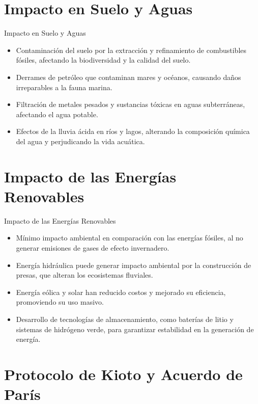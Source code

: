 \documentclass[main.tex]{subfiles}
\begin{document}
\section{Impacto en Suelo y Aguas}

\begin{frame}{Impacto en Suelo y Aguas}
    \begin{itemize}
        \item Contaminación del suelo por la extracción y refinamiento de combustibles fósiles, afectando la biodiversidad y la calidad del suelo.
        \item Derrames de petróleo que contaminan mares y océanos, causando daños irreparables a la fauna marina.
        \item Filtración de metales pesados y sustancias tóxicas en aguas subterráneas, afectando el agua potable.
        \item Efectos de la lluvia ácida en ríos y lagos, alterando la composición química del agua y perjudicando la vida acuática.
    \end{itemize}
\end{frame}

\section{Impacto de las Energías Renovables}

\begin{frame}{Impacto de las Energías Renovables}
    \begin{itemize}
        \item Mínimo impacto ambiental en comparación con las energías fósiles, al no generar emisiones de gases de efecto invernadero.
        \item Energía hidráulica puede generar impacto ambiental por la construcción de presas, que alteran los ecosistemas fluviales.
        \item Energía eólica y solar han reducido costos y mejorado su eficiencia, promoviendo su uso masivo.
        \item Desarrollo de tecnologías de almacenamiento, como baterías de litio y sistemas de hidrógeno verde, para garantizar estabilidad en la generación de energía.
    \end{itemize}
\end{frame}

\section{Protocolo de Kioto y Acuerdo de París}
\end{document}
